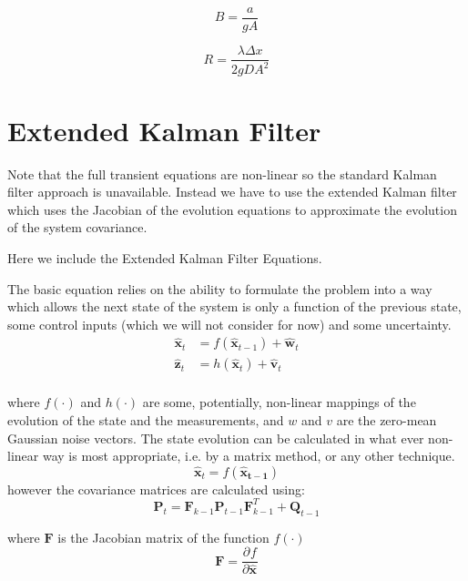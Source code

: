 \documentclass[]{article}
\providecommand{\pdiff}[3]{\frac{\partial^{#3} #1}{\partial #2^{#3}}}
\begin{document}
\begin{equation}
 B = \frac{a}{g A}
\end{equation}

\begin{equation}
 R = \frac{\lambda \Delta x}{2 g D A^2}
\end{equation}


\section{Extended Kalman Filter}\label{EKF}
Note that the full transient equations are non-linear so the standard Kalman filter approach is unavailable. 
Instead we have to use the extended Kalman filter which uses the Jacobian of the evolution equations to approximate the evolution of the system covariance. 


Here we include the Extended Kalman Filter Equations. 

The basic equation relies on the ability to formulate the problem into a way which allows the next state of the system is only a function of the previous state, some control inputs (which we will not consider for now) and some uncertainty.
\begin{equation}
\begin{split}
 \mathbf{\hat{x}}_t &= f(\mathbf{\hat{x}}_{t-1}) + \mathbf{\hat{w}}_t \\
 \mathbf{\hat{z}}_t &= h(\mathbf{\hat{x}}_t) + \mathbf{\hat{v}}_t \\
\end{split}
\end{equation}

where $f(\cdot)$ and $h(\cdot)$ are some, potentially, non-linear mappings of the evolution of the state and the measurements, and $w$ and $v$ are the zero-mean Gaussian noise vectors. 
The state evolution can be calculated in what ever non-linear way is most appropriate, i.e. by a matrix method, or any other technique. 
\begin{equation}
 \mathbf{\hat{x}}_t = f(\mathbf{\hat{x}_{t-1}})
\end{equation}
however the covariance matrices are calculated using:
\begin{equation}
 \mathbf{P}_t = \mathbf{F}_{k-1} \mathbf{P}_{t-1} \mathbf{F}_{k-1}^T + \mathbf{Q}_{t-1}
\end{equation}

where $\mathbf{F}$ is the Jacobian matrix of the function $f(\cdot)$
\begin{equation}
 \mathbf{F} = \pdiff{f}{\mathbf{\hat{x}}}{}
\end{equation}
\end{document}
